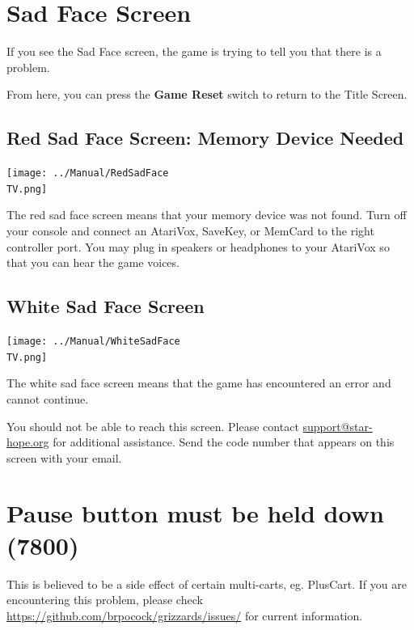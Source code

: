 \documentclass[10pt,twocolumn,openany,article]{memoir}
\newcommand\TV{NTSC}
\newcommand\TV{PAL}
\newcommand\TV{SECAM}
\begin{document}
\begin{description}
\fi

\section{Sad Face Screen}

If you  see the Sad  Face screen,  the game is  trying to tell  you that
there is a problem.

From here, you can press the \textbf{Game Reset} switch to return to the
Title Screen.

\ifdefined\NOSAVE\else

\subsection{Red Sad Face Screen: Memory Device Needed}

\texttt{[image: ../Manual/RedSadFace\\TV.png]}

The red  sad face screen  means that your  memory device was  not found.
Turn off  your console and connect  an AtariVox, SaveKey, or  MemCard to
the right  controller port. You  may plug  in speakers or  headphones to
your AtariVox so that you can hear the game voices.

\fi

\subsection{White Sad Face Screen}

\texttt{[image: ../Manual/WhiteSadFace\\TV.png]}

The white sad  face screen means that the game  has encountered an error
and cannot continue. 

You  should   not  be  able   to  reach  this  screen.   Please  contact
\href{mailto:support@star-hope.org}{support@star-hope.org}           for
additional assistance. Send the code  number that appears on this screen
with your email.

\section{Pause button must be held down (7800)}

This  is believed  to  be  a side  effect  of  certain multi-carts,  eg.
PlusCart.   If  you   are  encountering   this  problem,   please  check
\href{https://github.com/brpocock/grizzards/issues/182}{https://\-github.com/\-brpocock/\-grizzards/\-issues/}
for current information.


\end{description}
\end{document}
